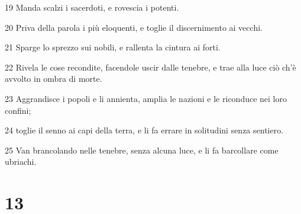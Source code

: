 \par 19 Manda scalzi i sacerdoti, e rovescia i potenti.
\par 20 Priva della parola i più eloquenti, e toglie il discernimento ai vecchi.
\par 21 Sparge lo sprezzo sui nobili, e rallenta la cintura ai forti.
\par 22 Rivela le cose recondite, facendole uscir dalle tenebre, e trae alla luce ciò ch'è avvolto in ombra di morte.
\par 23 Aggrandisce i popoli e li annienta, amplia le nazioni e le riconduce nei loro confini;
\par 24 toglie il senno ai capi della terra, e li fa errare in solitudini senza sentiero.
\par 25 Van brancolando nelle tenebre, senza alcuna luce, e li fa barcollare come ubriachi.

\chapter{13}

